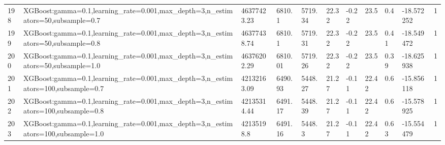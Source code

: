 \begin{longtable}{C{0.8cm} L{2cm} C{1.15cm} C{1.15cm} C{1.15cm} C{1.15cm} C{0.85cm} C{1.25cm} C{1.2cm} C{1.5cm} C{1.0cm}}
198 & XGBoost:\newline gamma=0.1,\newline learning\_rate=0.001,\newline max\_depth=3,\newline n\_estimators=50,\newline subsample=0.7 & 46377423.23 & 6810.1 & 5719.34 & 22.32 & -0.22 & 23.5 & 0.4 & -18.572252 & 1 \\
199 & XGBoost:\newline gamma=0.1,\newline learning\_rate=0.001,\newline max\_depth=3,\newline n\_estimators=50,\newline subsample=0.8 & 46377438.74 & 6810.1 & 5719.31 & 22.32 & -0.22 & 23.5 & 0.41 & -18.549472 & 1 \\
200 & XGBoost:\newline gamma=0.1,\newline learning\_rate=0.001,\newline max\_depth=3,\newline n\_estimators=50,\newline subsample=1.0 & 46376202.29 & 6810.01 & 5719.26 & 22.32 & -0.22 & 23.5 & 0.39 & -18.625938 & 1 \\
201 & XGBoost:\newline gamma=0.1,\newline learning\_rate=0.001,\newline max\_depth=3,\newline n\_estimators=100,\newline subsample=0.7 & 42132163.09 & 6490.93 & 5448.27 & 21.27 & -0.11 & 22.42 & 0.6 & -15.856118 & 1 \\
202 & XGBoost:\newline gamma=0.1,\newline learning\_rate=0.001,\newline max\_depth=3,\newline n\_estimators=100,\newline subsample=0.8 & 42135314.44 & 6491.17 & 5448.39 & 21.27 & -0.11 & 22.42 & 0.6 & -15.578925 & 1 \\
203 & XGBoost:\newline gamma=0.1,\newline learning\_rate=0.001,\newline max\_depth=3,\newline n\_estimators=100,\newline subsample=1.0 & 42135198.8 & 6491.16 & 5448.3 & 21.27 & -0.11 & 22.42 & 0.63 & -15.554479 & 1 \\

\end{longtable}
